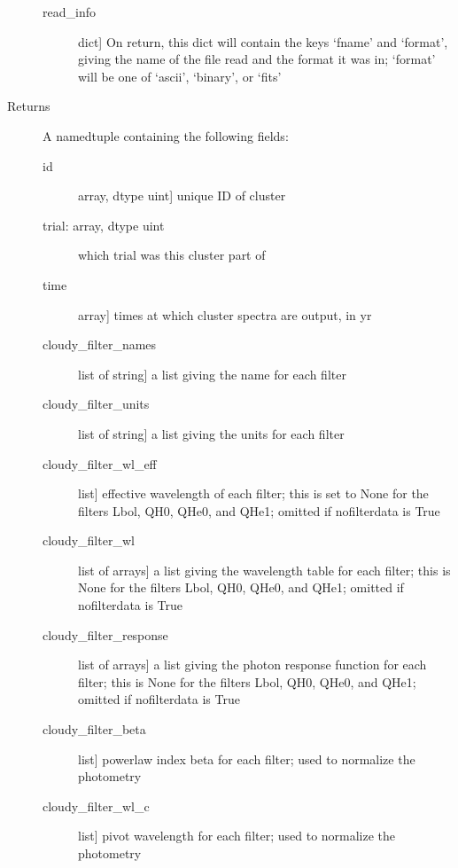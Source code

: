 \documentclass[letterpaper,10pt,english]{sphinxmanual}
\begin{document}
\begin{fulllineitems}
\begin{description}
\begin{description}
\item[{read\_info}] \leavevmode{[}dict{]}
On return, this dict will contain the keys `fname' and
`format', giving the name of the file read and the format it
was in; `format' will be one of `ascii', `binary', or `fits'

\end{description}

\item[{Returns}] \leavevmode
A namedtuple containing the following fields:
\begin{description}
\item[{id}] \leavevmode{[}array, dtype uint{]}
unique ID of cluster

\item[{trial: array, dtype uint}] \leavevmode
which trial was this cluster part of

\item[{time}] \leavevmode{[}array{]}
times at which cluster spectra are output, in yr

\item[{cloudy\_filter\_names}] \leavevmode{[}list of string{]}
a list giving the name for each filter

\item[{cloudy\_filter\_units}] \leavevmode{[}list of string{]}
a list giving the units for each filter

\item[{cloudy\_filter\_wl\_eff}] \leavevmode{[}list{]}
effective wavelength of each filter; this is set to None for the
filters Lbol, QH0, QHe0, and QHe1; omitted if nofilterdata is
True

\item[{cloudy\_filter\_wl}] \leavevmode{[}list of arrays{]}
a list giving the wavelength table for each filter; this is
None for the filters Lbol, QH0, QHe0, and QHe1; omitted if
nofilterdata is True

\item[{cloudy\_filter\_response}] \leavevmode{[}list of arrays{]}
a list giving the photon response function for each filter;
this is None for the filters Lbol, QH0, QHe0, and QHe1; omitted
if nofilterdata is True

\item[{cloudy\_filter\_beta}] \leavevmode{[}list{]}
powerlaw index beta for each filter; used to normalize the
photometry

\item[{cloudy\_filter\_wl\_c}] \leavevmode{[}list{]}
pivot wavelength for each filter; used to normalize the photometry


\end{description}
\end{description}
\end{fulllineitems}
\end{document}
